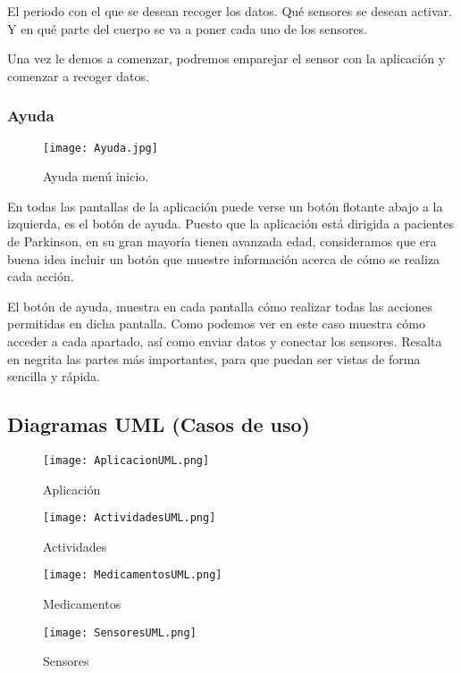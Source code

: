 \documentclass[11pt,spanish]{article}
\begin{document}
El periodo con el que se desean recoger los datos.
Qué sensores se desean activar.
Y en qué parte del cuerpo se va a poner cada uno de los sensores.
\newline

Una vez le demos a comenzar, podremos emparejar el sensor con la aplicación y comenzar a recoger datos.
\newline

\subsubsection{Ayuda}
\begin{figure}[!htb]
\centering
\texttt{[image: Ayuda.jpg]}
\caption{Ayuda menú inicio.}
\end{figure}

En todas las pantallas de la aplicación puede verse un botón flotante abajo a la izquierda, es el botón de ayuda. Puesto que la aplicación está dirigida a pacientes de Parkinson, en su gran mayoría tienen avanzada edad, consideramos que era buena idea incluir un botón que muestre información acerca de cómo se realiza cada acción.
\newline

El botón de ayuda, muestra en cada pantalla cómo realizar todas las acciones permitidas en dicha pantalla. Como podemos ver en este caso muestra cómo acceder a cada apartado, así como enviar datos y conectar los sensores. Resalta en negrita las partes más importantes, para que puedan ser vistas de forma sencilla y rápida.
\newpage

\subsection{Diagramas UML (Casos de uso)}
\begin{figure}[!htb]
  \texttt{[image: AplicacionUML.png]}
  \caption{Aplicación}
\endminipage\hfill
{}
  \texttt{[image: ActividadesUML.png]}
  \caption{Actividades}
\endminipage\hfill
\end{figure}

\begin{figure}[!htb]
%
  \texttt{[image: MedicamentosUML.png]}
  \caption{Medicamentos}
\endminipage
{}%
  \texttt{[image: SensoresUML.png]}
  \caption{Sensores}
\endminipage
\end{figure}
\newpage
\end{document}
